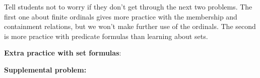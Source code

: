 \documentclass[handout]{mcs}
\begin{document}





\begin{staffnotes}
Tell students not to worry if they don't get through the next two
problems.  The first one about finite ordinals gives more practice
with the membership and containment relations, but we won't make
further use of the ordinals.  The second is more practice with
predicate formulas than learning about sets.
\end{staffnotes}

\textbf{Extra practice with set formulas}:


\instatements{\newpage}

\textbf{Supplemental problem:}





\end{document}
